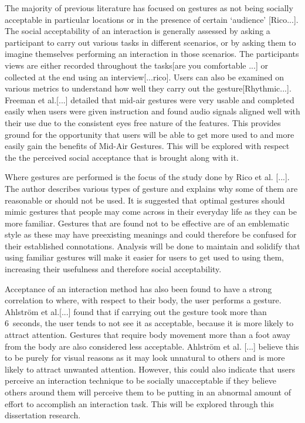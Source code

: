 \documentclass{l4proj}
\begin{document}
The majority of previous literature has focused on gestures as not being socially acceptable in particular locations or in the presence of certain `audience' [Rico...]. The social acceptability of an interaction is generally assessed by asking a participant to carry out various tasks in different scenarios, or by asking them to imagine themselves performing an interaction in those scenarios. The participants views are either recorded throughout the tasks[are you comfortable ...] or collected at the end using an interview[...rico]. Users can also be examined on various metrics to understand how well they carry out the gesture[Rhythmic...]. Freeman et al.[...] detailed that mid-air gestures were very usable and completed easily when users were given instruction and found audio signals aligned well with their use due to the consistent eyes free nature of the features. This provides ground for the opportunity that users will be able to get more used to and more easily gain the benefits of Mid-Air Gestures. This will be explored with respect the the perceived social acceptance that is brought along with it.

Where gestures are performed is the focus of the study done by Rico et al. [...]. The author describes various types of gesture and explains why some of them are reasonable or should not be used. It is suggested that optimal gestures should mimic gestures that people may come across in their everyday life as they can be more familiar. Gestures that are found not to be effective are of an emblematic style as these may have preexisting meanings and could therefore be confused for their established connotations. Analysis will be done to maintain and solidify that using familiar gestures will make it easier for users to get used to using them, increasing their usefulness and therefore social acceptability.

Acceptance of an interaction method has also been found to have a strong correlation to where, with respect to their body, the user performs a gesture. Ahlström et al.[...] found that if carrying out the gesture took more than 6~seconds, the user tends to not see it as acceptable, because it is more likely to attract attention. Gestures that require body movement more than a foot away from the body are also considered less acceptable. Ahlström et al. [...] believe this to be purely for visual reasons as it may look unnatural to others and is more likely to attract unwanted attention. However, this could also indicate that users perceive an interaction technique to be socially unacceptable if they believe others around them will perceive them to be putting in an abnormal amount of effort to accomplish an interaction task. This will be explored through this dissertation research.
\end{document}
